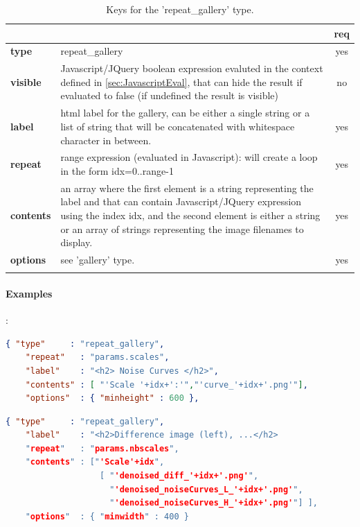 \begin{longtable}{|>{\bf}L{\linewidth}|L{\linewidth}|c|}
\hline
{}     &  & {\bf req} \tabularnewline 
\hline \hline
 type       & repeat\_gallery  & yes \\ \hline
 visible    & Javascript/JQuery boolean expression evaluted in the context 
              defined in \ref{sec:JavascriptEval}, that can hide the result if
              evaluated to false (if undefined the result is visible)& no \\ \hline
 label      & html label for the gallery, can be either a single string or 
             a list of string that will be concatenated with whitespace character
              in between.& yes \\ \hline
 repeat     & range expression (evaluated in Javascript):
              will create a loop in the form idx=0..range-1 & yes \\ \hline
 contents   & an array where the first element is a string representing the label
              and that can contain Javascript/JQuery expression using the index idx, and
              the second element is either a string or an array of strings
              representing the image filenames to display. & yes \\ \hline
 options    & see 'gallery' type. & yes \\ \hline
\caption{Keys for the 'repeat\_gallery' type.}
\end{longtable}

\paragraph{Examples}:\\
\begin{lstlisting}[language=json,firstnumber=1]
  { "type"     : "repeat_gallery",
    "repeat"   : "params.scales",
    "label"    : "<h2> Noise Curves </h2>",
    "contents" : [ "'Scale '+idx+':'","'curve_'+idx+'.png'"],
    "options"  : { "minheight" : 600 },
\end{lstlisting}

\begin{lstlisting}[language=json,firstnumber=1]
  { "type"     : "repeat_gallery",
    "label"    : "<h2>Difference image (left), ...</h2> 
    "repeat"   : "params.nbscales",
    "contents" : ["'Scale'+idx",
                   [ "'denoised_diff_'+idx+'.png'",
                     "'denoised_noiseCurves_L_'+idx+'.png'",
                     "'denoised_noiseCurves_H_'+idx+'.png'"] ],
    "options"  : { "minwidth" : 400 }
\end{lstlisting}


